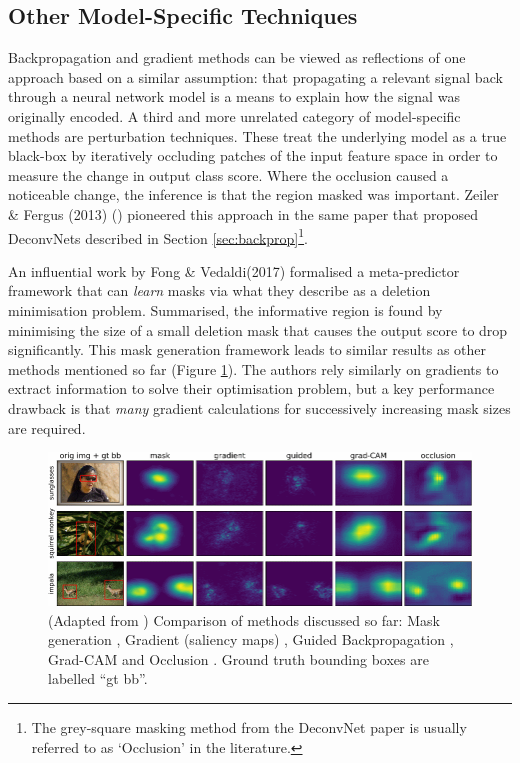 \documentclass[main]{subfiles}
\begin{document}

\subsection{Other Model-Specific Techniques} \label{sec:otherms}

Backpropagation and gradient methods can be viewed as reflections of one approach based on a similar assumption: that propagating a relevant signal back through a neural network model is a means to explain how the signal was originally encoded. A third and more unrelated category of model-specific methods are perturbation techniques. These treat the underlying model as a true black-box by iteratively occluding patches of the input feature space in order to measure the change in output class score. Where the occlusion caused a noticeable change, the inference is that the region masked was important. Zeiler \& Fergus (2013) (\cite{zeilerfergus2013}) pioneered this approach in the same paper that proposed DeconvNets described in Section \ref{sec:backprop}\footnote{The grey-square masking method from the DeconvNet paper is usually referred to as `Occlusion' in the literature.}. 


An influential work by Fong \& Vedaldi(2017) \cite{perturb_fong} formalised a meta-predictor framework that can \textit{learn} masks via what they describe as a deletion minimisation problem. Summarised, the informative region is found by minimising the size of a small deletion mask that causes the output score to drop significantly. This mask generation framework leads to similar results as other methods mentioned so far (Figure \ref{comparisonimg}). The authors rely similarly on gradients to extract information to solve their optimisation problem, but a key performance drawback is that \textit{many} gradient calculations for successively increasing mask sizes are required.



\begin{figure}[h]
\centering
\includegraphics[scale=0.65]{perturb.png}
\caption{(Adapted from \cite{perturb_fong}) Comparison of methods discussed so far: Mask generation \cite{perturb_fong}, Gradient (saliency maps) \cite{saliencyII}, Guided Backpropagation \cite{springenberg}, Grad-CAM \cite{gradcam} and Occlusion \cite{zeilerfergus2013}. Ground truth bounding boxes are labelled ``gt bb''.}
\label{comparisonimg}
\end{figure}
\end{document}
